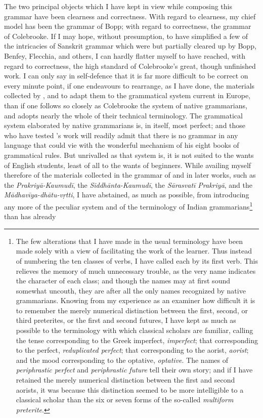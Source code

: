 The two principal objects which I have kept in view while composing this
grammar have been clearness and correctness. With regard to clearness,
my chief model has been the grammar of Bopp; with regard to correctness,
the grammar of Colebrooke. If I may hope, without presumption, to have
simplified a few of the intricacies of Sanskrit grammar which were but
partially cleared up by Bopp, Benfey, Flecchia, and others, I can hardly
flatter myself to have reached, with regard to correctness, the high
standard of Colebrooke's great, though unfinished work. I can only say
in self-defence that it is far more difficult to be correct on every
minute point, if one endeavours to rearrange, as I have done, the
materials collected by \panini{}, and to adapt them to the grammatical
system current in Europe, than if one follows so closely as Colebrooke
the system of native grammarians, and adopts nearly the whole of their
technical terminology. The grammatical system elaborated by native
grammarians is, in itself, most perfect; and those who have tested
\panini{}'s work will readily admit that there is no grammar in any
language that could vie with the wonderful mechanism of his eight books
of grammatical rules. But unrivalled as that system is, it is not suited
to the wants of English students, least of all to the wants of
beginners. While availing myself therefore of the materials collected in
the grammar of \panini{} and in later works, such as the
\emph{Prakriyā-Kaumudī}, the \emph{Siddhānta-Kaumudī}, the
\emph{Sārasvatī Prakriyā}, and the \emph{Mādhavīya-dhātu-vṛtti}, I have
abstained, as much as possible, from introducing any more of the
peculiar system and of the terminology of Indian
grammarians\footnote{The few alterations that I have made in the usual
  terminology have been made solely with a view of facilitating the work
  of the learner. Thus instead of numbering the ten classes of verbs, I
  have called each by its first verb. This relieves the memory of much
  unnecessary trouble, as the very name indicates the character of each
  class; and though the names may at first sound somewhat uncouth, they
  are after all the only names recognized by native grammarians. Knowing
  from my experience as an examiner how difficult it is to remember the
  merely numerical distinction between the first, second, or third
  preterites, or the first and second futures, I have kept as much as
  possible to the terminology with which classical scholars are
  familiar, calling the tense corresponding to the Greek imperfect, {\em
    imperfect}; that corresponding to the perfect, {\em reduplicated
    perfect}; that corresponding to the aorist, {\em aorist}; and the
  mood corresponding to the optative, {\em optative}. The names of {\em
    periphrastic perfect} and {\em periphrastic future} tell their own
  story; and if I have retained the merely numerical distinction between
  the first and second aorists, it was because this distinction seemed
  to be more intelligible to a classical scholar than the six or seven
  forms of the so-called {\em multiform preterite}.} than has already
